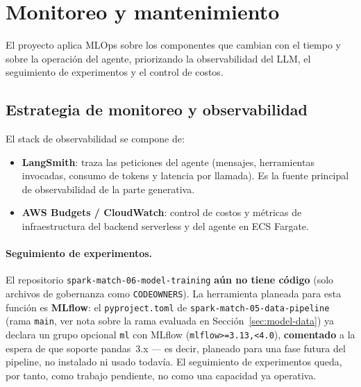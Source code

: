 \section{Monitoreo y mantenimiento}
\label{sec:monitoring}

El proyecto aplica MLOps sobre los componentes que cambian con el tiempo y sobre
la operaci\'on del agente, priorizando la observabilidad del LLM, el seguimiento
de experimentos y el control de costos.

\subsection{Estrategia de monitoreo y observabilidad}

El stack de observabilidad se compone de:

\begin{itemize}[noitemsep]
  \item \textbf{LangSmith}: traza las peticiones del agente (mensajes,
        herramientas invocadas, consumo de tokens y latencia por llamada). Es la
        fuente principal de observabilidad de la parte generativa.
  \item \textbf{AWS Budgets / CloudWatch}: control de costos y m\'etricas de
        infraestructura del backend serverless y del agente en ECS Fargate.
\end{itemize}

\paragraph{Seguimiento de experimentos.} El repositorio
\texttt{spark-match-06-model-training} \textbf{a\'un no tiene c\'odigo} (solo
archivos de gobernanza como \texttt{CODEOWNERS}). La herramienta planeada para
esta funci\'on es \textbf{MLflow}: el \texttt{pyproject.toml} de
\texttt{spark-match-05-data-pipeline} (rama \texttt{main}, ver nota sobre la
rama evaluada en Secci\'on~\ref{sec:model-data}) ya declara un grupo opcional
\texttt{ml} con MLflow (\texttt{mlflow>=3.13,<4.0}), \textbf{comentado} a la
espera de que soporte pandas~3.x --- es decir, planeado para una fase futura
del pipeline, no instalado ni usado todav\'ia. El seguimiento de experimentos
queda, por tanto, como trabajo pendiente, no como una capacidad ya operativa.

